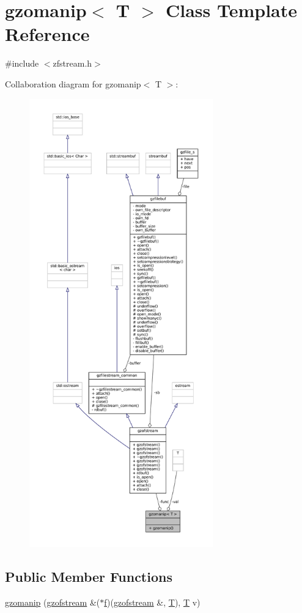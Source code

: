 \hypertarget{classgzomanip}{}\section{gzomanip$<$ T $>$ Class Template Reference}
\label{classgzomanip}


{\ttfamily \#include $<$zfstream.\+h$>$}



Collaboration diagram for gzomanip$<$ T $>$\+:
\nopagebreak
\begin{figure}[H]
\begin{center}
\leavevmode
\includegraphics[height=550pt]{classgzomanip__coll__graph}
\end{center}
\end{figure}
\subsection*{Public Member Functions}
\begin{DoxyCompactItemize}
\item 
\mbox{\hyperlink{classgzomanip_a62e624a4096f8d543472895936b80c13}{gzomanip}} (\mbox{\hyperlink{classgzofstream}{gzofstream}} \&($\ast$\mbox{\hyperlink{isa-arm_8c_a362077c979b0bb65159c603270e40f70}{f}})(\mbox{\hyperlink{classgzofstream}{gzofstream}} \&, \mbox{\hyperlink{_aes_8c_af6f2f773ebe19973d2b24c1b959affe6}{T}}), \mbox{\hyperlink{_aes_8c_af6f2f773ebe19973d2b24c1b959affe6}{T}} v)
\end{DoxyCompactItemize}
